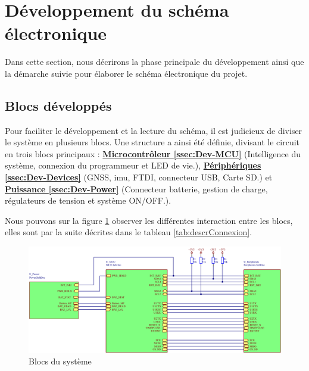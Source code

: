 \section{Développement du schéma électronique} \label{sec:Dev-Schematique}
Dans cette section, nous décrirons la phase principale du développement ainsi que la démarche suivie pour élaborer le schéma électronique du projet.

\subsection{Blocs développés} \label{ssec:Dev-blocs}
Pour faciliter le développement et la lecture du schéma, il est judicieux de diviser le système en plusieurs blocs. Une structure a ainsi été définie, divisant le circuit en trois blocs principaux : \hyperref[ssec:Dev-MCU]{\textbf{Microcontrôleur \ref{ssec:Dev-MCU}}} (Intelligence du système, connexion du programmeur et LED de vie.), \hyperref[ssec:Dev-Devices]{\textbf{Périphériques \ref{ssec:Dev-Devices}}} (\gls{GNSS}, \gls{imu}, \gls{FTDI}, connecteur USB, Carte SD.) et \hyperref[ssec:Dev-Power]{\textbf{Puissance \ref{ssec:Dev-Power}}} (Connecteur batterie, gestion de charge, régulateurs de tension et système ON/OFF.).

Nous pouvons sur la figure \ref{fig:blocs} observer les différentes interaction entre les blocs, elles sont par la suite décrites dans le tableau \ref{tab:descrConnexion}.

\begin{figure}[h]
	\centering
	\includegraphics[width=1\linewidth]{../figures/etude/sch/BLOCS}
	\caption{Blocs du système}
	\label{fig:blocs}
\end{figure}

